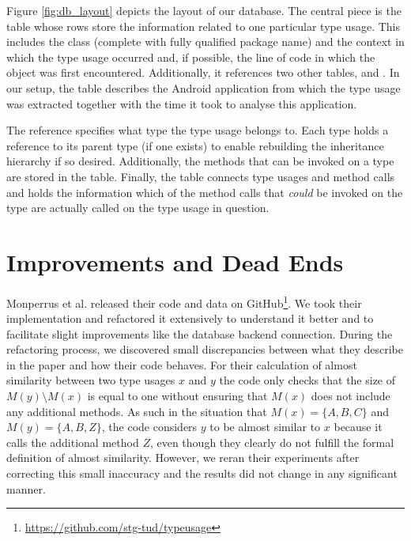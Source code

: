 Figure \ref{fig:db_layout} depicts the layout of our database.
The central piece is the  table whose rows store the information related to one particular type usage.
This includes the class (complete with fully qualified package name) and the context in which the type usage occurred and, if possible, the line of code in which the object was first encountered.
Additionally, it references two other tables,  and .
In our setup, the  table describes the Android application from which the type usage was extracted together with the time it took to analyse this application.

The  reference specifies what type the type usage belongs to. Each type holds a reference to its parent type (if one exists) to enable rebuilding the inheritance hierarchy if so desired.
Additionally, the methods that can be invoked on a type are stored in the  table.
Finally, the  table connects type usages and method calls and holds the information which of the method calls that \emph{could} be invoked on the type are actually called on the type usage in question.


\section{Improvements and Dead Ends}\label{sec:deadends}


Monperrus et al. released their code and data on GitHub\footnote{\url{https://github.com/stg-tud/typeusage}}.
We took their implementation and refactored it extensively to understand it better and to facilitate slight improvements like the database backend connection.
During the refactoring process, we discovered small discrepancies between what they describe in the paper and how their code behaves.
For their calculation of almost similarity between two type usages $x$ and $y$ the code only checks that the size of $M(y) \setminus M(x)$ is equal to one without ensuring that $M(x)$ does not include any additional methods.
As such in the situation that $M(x) =\{A, B, C\}$ and $M(y) = \{A, B, Z\}$, the code considers $y$ to be almost similar to $x$ because it calls the additional method $Z$, even though they clearly do not fulfill the formal definition of almost similarity.
However, we reran their experiments after correcting this small inaccuracy and the results did not change in any significant manner.


